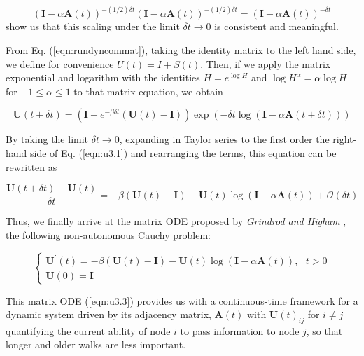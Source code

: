 $$(\mathbf{I} - \alpha\mathbf{A}(t))^{-(1/2)\delta t} (\mathbf{I} - \alpha\mathbf{A}(t))^{-(1/2)\delta t} = (\mathbf{I} - \alpha\mathbf{A}(t))^{-\delta t}$$ show us that this scaling under the limit $\delta t \to 0$ is consistent and meaningful.

From Eq. (\ref{eqn:rundyncommat}), taking the identity matrix to the left hand side, we define for convenience $U(t)=I + S(t)$. Then, if we apply the matrix exponential and logarithm with the identities $H =e^{\log H}$ and $\log H^\alpha =\alpha\log H$ for $-1 \le \alpha \le 1$ \cite{higham2008functions} to that matrix equation, we obtain 

\begin{equation}
\label{eqn:u3.1}
    \mathbf{U}(t + \delta t) = (\mathbf{I} + e^{-\beta\delta t}(\mathbf{U}(t) - \mathbf{I})) \exp\left(-\delta t \log (\mathbf{I} - \alpha \mathbf{A}(t + \delta t)) \right)
\end{equation} 

By taking the limit $\delta t \to 0$, expanding in Taylor series to the first order the right-hand
side of Eq. (\ref{eqn:u3.1}) and rearranging the terms, this equation can be rewritten as

\begin{equation*}
\label{eqn:u3.1b}
    \frac{\mathbf{U}(t + \delta t) - \mathbf{U}(t)}{\delta t} = -\beta (\mathbf{U}(t) - \mathbf{I}) - \mathbf{U}(t)\log (\mathbf{I} - \alpha \mathbf{A}(t)) + \mathcal{O}(\delta t)
\end{equation*}

Thus, we finally arrive at the matrix ODE proposed by \textsl{Grindrod and Higham} \cite{grindrod2014dynamical}, the following non-autonomous Cauchy problem:

\begin{equation}
\label{eqn:u3.3}
    \begin{cases}
      \mathbf{U^{\prime}}(t) = -\beta (\mathbf{U}(t) - \mathbf{I}) - \mathbf{U}(t)\log (\mathbf{I} - \alpha \mathbf{A}(t)), ~~~t>0\\
      \mathbf{U}(0)=\mathbf{I}
    \end{cases}
\end{equation}

This matrix ODE (\ref{eqn:u3.3}) provides us with a continuous-time framework for a dynamic system driven by its adjacency matrix, $\mathbf{A}(t)$ with $\mathbf{U}(t)_{ij}$ for $i\ne j$ quantifying the current ability of node $i$ to pass information to node $j$, so that longer and older walks are less important.

